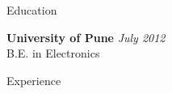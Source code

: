 \documentclass{resume} %
\begin{document}

\begin{rSection}{Education}

{\bf University of Pune} \hfill {\em July 2012} \\ 
B.E. in Electronics

\end{rSection}


\begin{rSection}{Experience}


\end{rSection}
\end{document}
